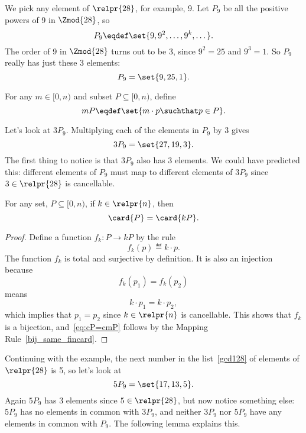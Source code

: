 We pick any element of $\relpr{28}$, for example, 9.  Let $P_9$ be all
the positive powers of 9 in $\Zmod{28}$, so
\[
P_9 \eqdef \set{9, 9^2, \dots, 9^k, \dots}.
\]
The order of 9 in $\Zmod{28}$ turns out to be 3, since $9^2 = 25$ and
$9^3 = 1$.  So $P_9$ really has just these 3 elements:
\[
P_9 = \set{9, 25, 1}.
\]
\begin{definition}
For any $m \in [0,n)$ and subset $P \subseteq [0,n)$, define
\[
mP \eqdef \set{m \cdot p \suchthat p \in P}.
\]
\end{definition}

Let's look at $3P_9$.  Multiplying each of the elements in $P_9$ by 3
gives
\[
3P_9 = \set{27, 19, 3}.
\]
The first thing to notice is that $3P_9$ also has 3 elements.  We
could have predicted this: different elements of $P_9$ must map to
different elements of $3P_9$ since $3 \in \relpr{28}$ is cancellable.

\begin{lemma}\label{lem:cP=cmP}
For any set, $P \subseteq [0,n)$, if $k \in \relpr{n}$, then
\begin{equation}\label{eq:cP=cmP}
\card{P} = \card{kP}.
\end{equation}

\begin{proof}
Define a function $f_k:P \to kP$ by the rule
\[
f_k(p) \eqdef k \cdot p.
\]
The function $f_k$ is total and surjective \iffalse ($[=
  1\ \text{out}, \geq 1\ \text{in}]$)\fi by definition.  It is also an
injection \iffalse ($[\leq 1\ \text{in}]$)\fi because
\[
f_k(p_1) = f_k(p_2)
\]
means
\[
k \cdot p_1 = k \cdot p_2, 
\]
which implies that $p_1 = p_2$ since $k \in \relpr{n}$ is cancellable.
This shows that $f_k$ is a bijection, and~\eqref{eq:cP=cmP} follows by
the Mapping Rule~\ref{bij_same_fincard}.
\end{proof}

\end{lemma}

Continuing with the example, the next number in the
list~\eqref{gcd128} of elements of $\relpr{28}$ is 5, so let's look at
\[
5P_9 = \set{17, 13, 5}.
\]
Again $5P_9$ has 3 elements since $5 \in \relpr{28}$, but now notice
something else: $5P_9$ has no elements in common with $3P_9$, and
neither $3P_9$ nor $5P_9$ have any elements in common with $P_9$.  The
following lemma explains this.

